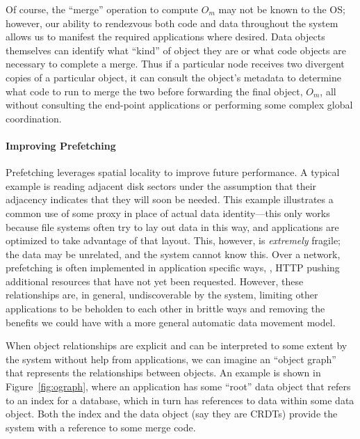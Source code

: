 Of course, the ``merge'' operation to compute $O_m$ may not be known to the OS; however, our
ability to rendezvous both code and data throughout the system allows us to manifest the required
applications where desired. Data objects themselves can identify what ``kind'' of object they are or
what code objects are necessary to complete a merge.
Thus if a particular node receives two divergent copies of a particular object, it can consult the
object's metadata to determine what code to run to merge the two before forwarding the final object,
$O_m$, all without consulting the end-point applications or performing some complex global
coordination.


\paragraph{Improving Prefetching}
\label{sec:prefetch}

Prefetching leverages spatial locality to improve future performance. A typical example is
reading adjacent disk sectors under the assumption that their adjacency indicates that they
will soon be needed. This example illustrates a common use of some proxy in place of actual data
identity---this only works because file systems often try to lay out data in this way, and
applications are optimized to take advantage of that layout. This, however, is \emph{extremely}
fragile; the data may be unrelated, and the system cannot know this. Over a network, prefetching is
often implemented in application specific ways, \eg, HTTP pushing additional resources that have
not yet been requested. However, these relationships are, in general, undiscoverable by the system,
limiting other applications to be beholden to each other in brittle ways
and removing the benefits we could have with a more general automatic data movement
model.

When object relationships are explicit and can be interpreted to some extent by the
system without help from applications, we can imagine an ``object graph'' that represents the
relationships between objects. An example is shown in Figure~\ref{fig:ograph}, where
an application has some ``root'' data object that refers to an index for a database, which in turn
has references to data within some data object. Both the index and the data object (say they are
CRDTs) provide the system with a reference to some merge code.


